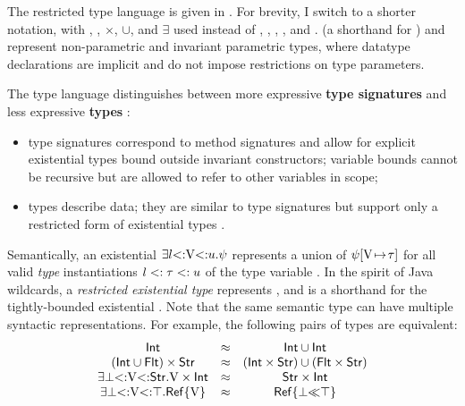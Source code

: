 The restricted type language is given in .
For brevity, I switch to a shorter notation, with \tyany, \tybot, 
$\times$, $\cup$, and $\exists$ used instead of
, , , , and . 
\iname (a shorthand for \tyinv\iname{}) and 
\tyinv\iname{\ldots} represent
non-parametric and invariant parametric types, where datatype
declarations are implicit and do not impose restrictions on type parameters.

The type language distinguishes between more expressive
\textbf{type signatures} \tysig
and less expressive \textbf{types} \ty:
\begin{itemize}
    \item type signatures \tysig correspond to method signatures
      and allow for explicit existential types bound outside
      invariant constructors; variable bounds cannot be recursive but are
      allowed to refer to other variables in scope;
    \item types \ty describe data; they are similar to type signatures
      but support only a restricted form of existential types
      \tyinv\iname\rexvars.
\end{itemize}
Semantically, an existential $\exists l{\operatorname{<:}}\mathrm{V}{\operatorname{<:}}u.\psi$ 
represents a union of $\psi[\mathrm{V}\!\mapsto\!\tau]$ for all valid
\emph{type} instantiations $l <: \tau <: u$ of the type variable \vany.
In the spirit of Java wildcards, a \emph{restricted existential type} 
\tyinv{} %
represents
,
and \tyinv{} is a shorthand for the tightly-bounded
existential \tyinv{}.
Note that the same semantic type can have multiple syntactic representations.
For example, the following pairs of types are equivalent:
\[
\begin{array}{ccc}
    \mathsf{Int} &\approx& 
        \mathsf{Int} \cup \mathsf{Int} \\
    (\mathsf{Int} \cup \mathsf{Flt}) \times \mathsf{Str} &\approx&
        (\mathsf{Int} \times \mathsf{Str}) \cup (\mathsf{Flt} \times \mathsf{Str}) \\
    \exists\bot{\operatorname{<:}}\mathrm{V}{\operatorname{<:}}\mathsf{Str}.\mathrm{V} \times \mathsf{Int} &\approx& 
        \mathsf{Str} \times \mathsf{Int} \\
    \exists\bot{\operatorname{<:}}\mathrm{V}{\operatorname{<:}}\top.\mathsf{Ref}\{\mathrm{V}\} &\approx&
        \mathsf{Ref}\{\bot{\operatorname{\ll}}\top\} \\
\end{array}
\]

